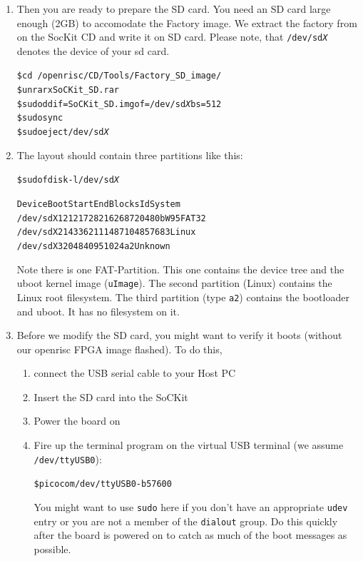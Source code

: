 \documentclass[twoside]{article}
\begin{document}
\begin{enumerate}
\item Then you are ready to prepare the SD card. You need an SD card
  large enough (2GB) to accomodate the Factory image. We extract the
  factory from on the SocKit CD and write it on SD card. Please note,
  that \texttt{/dev/sd\emph{X}} denotes the device of your sd card.

  \begin{alltt}
\$ cd ~/openrisc/CD/Tools/Factory_SD_image/
\$ unrar x SoCKit_SD.rar 
\$ sudo dd if=SoCKit_SD.img of=/dev/sd\emph{X} bs=512
\$ sudo sync
\$ sudo eject /dev/sd\emph{X}
  \end{alltt}

\item The layout should contain three partitions like this:
  \begin{alltt}
\$ sudo fdisk -l /dev/sd\emph{X}

   Device Boot      Start         End      Blocks   Id  System
/dev/sdX1         2121728     2162687       20480    b  W95 FAT32
/dev/sdX2           14336     2111487     1048576   83  Linux
/dev/sdX3            2048        4095        1024   a2  Unknown    
  \end{alltt}
Note there is one FAT-Partition. This one contains the device tree and
the uboot kernel image (\texttt{uImage}). The second partition
(Linux) contains the Linux root filesystem. The third partition (type
\texttt{a2}) contains the bootloader and uboot. It has no filesystem
on it.

\item Before we modify the SD card, you might want to verify it boots
  (without our openrisc FPGA image flashed). 
  To do this, 
  \begin{enumerate}
  \item connect the USB serial cable to your Host PC 
  \item Insert the SD card into the SoCKit
  \item Power the board on
  \item Fire up the terminal program on the virtual USB terminal (we
    assume \texttt{/dev/ttyUSB0}):
    \begin{alltt}
\$ picocom /dev/ttyUSB0 -b 57600
    \end{alltt}
    You might want to use \texttt{sudo} here if you don't have an
    appropriate \texttt{udev} entry or you are not a member of the
    \texttt{dialout} group.
    Do this quickly after the board is powered on to catch as much of
    the boot messages as possible.
  \end{enumerate}


\end{enumerate}
\end{document}
